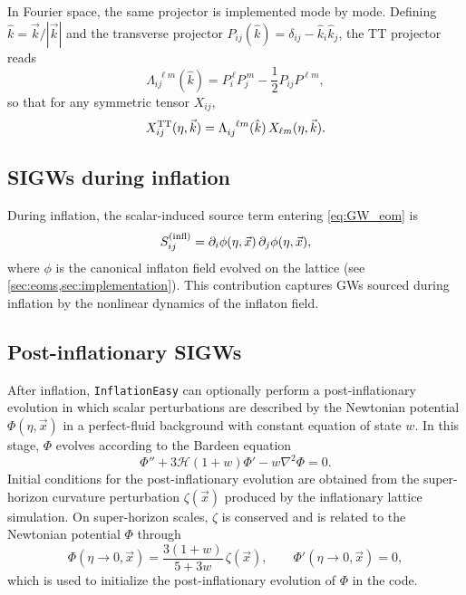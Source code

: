 \documentclass[aps, nofootinbib,superscriptaddress, preprintnumbers, longbibliography]{article}
\begin{document}
In Fourier space, the same projector is implemented mode by mode. Defining $\hat{k}=\vec{k}/|\vec{k}|$ and the transverse projector $P_{ij}(\hat{k})=\delta_{ij}-\hat{k}_i\hat{k}_j$, the TT projector reads
\begin{equation}
\label{eq:GW_TT_k}
\Lambda_{ij}^{\ \ \ell m}(\hat{k})
=
P_i^{\ \ell} P_j^{\ m}
-\frac12 P_{ij} P^{\ell m},
\end{equation}
so that for any symmetric tensor $X_{ij}$,
\begin{equation}
X_{ij}^{\rm TT}(\eta,\vec{k})
=
\Lambda_{ij}^{\ \ \ell m}(\hat{k})\,X_{\ell m}(\eta,\vec{k}).
\end{equation}



\subsection{SIGWs during inflation}

During inflation, the scalar-induced source term entering \cref{eq:GW_eom} is
\begin{equation}
\label{eq:GW_source_infl}
S_{ij}^{(\rm infl)}
=
\partial_i \phi(\eta,\vec{x})\,
\partial_j \phi(\eta,\vec{x}),
\end{equation}
where $\phi$ is the canonical inflaton field evolved on the lattice (see \cref{sec:eoms,sec:implementation}). This contribution captures GWs sourced during inflation by the nonlinear dynamics of the inflaton field.

\subsection{Post-inflationary SIGWs}

After inflation, \texttt{InflationEasy} can optionally perform a post-inflationary evolution in which scalar perturbations are described by the Newtonian potential $\Phi(\eta,\vec{x})$ in a perfect-fluid background with constant equation of state $w$. In this stage, $\Phi$ evolves according to the Bardeen equation
\begin{equation}
\label{eq:GW_Bardeen}
\Phi'' + 3\mathcal{H}(1+w)\Phi' - w\nabla^2 \Phi = 0.
\end{equation}
Initial conditions for the post-inflationary evolution are obtained from the super-horizon curvature perturbation $\zeta(\vec{x})$ produced by the inflationary lattice simulation. On super-horizon scales, $\zeta$ is conserved and is related to the Newtonian potential $\Phi$ through
\begin{equation}
\label{eq:zeta_to_phi}
\Phi(\eta \rightarrow 0,\vec{x})
=
\frac{3(1+w)}{5+3w}\,\zeta(\vec{x}),
\qquad
\Phi'(\eta \rightarrow 0,\vec{x}) = 0 ,
\end{equation}
which is used to initialize the post-inflationary evolution of $\Phi$ in the code.
\end{document}
